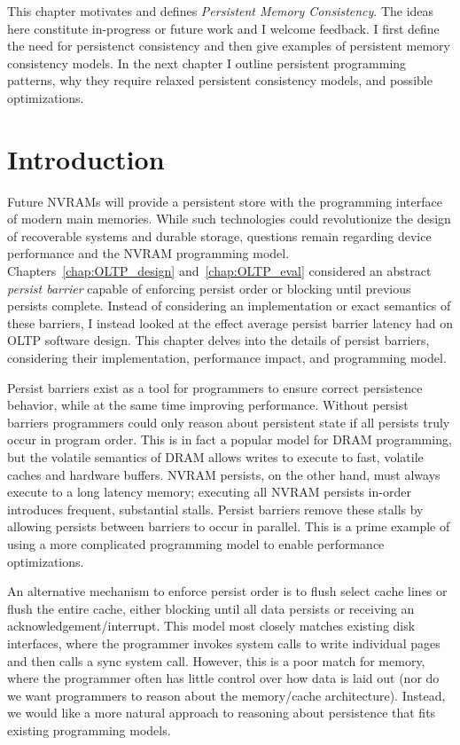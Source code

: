 This chapter motivates and defines \emph{Persistent Memory Consistency}.
The ideas here constitute in-progress or future work and I welcome feedback.
I first define the need for persistenct consistency and then give examples of persistent memory consistency models.
In the next chapter I outline persistent programming patterns, why they require relaxed persistent consistency models, and possible optimizations.

\section{Introduction}
\label{sec:PMC:Intro}

Future NVRAMs will provide a persistent store with the programming interface of modern main memories.
While such technologies could revolutionize the design of recoverable systems and durable storage, questions remain regarding device performance and the NVRAM programming model.
Chapters~\ref{chap:OLTP_design} and~\ref{chap:OLTP_eval} considered an abstract \emph{persist barrier} capable of enforcing persist order or blocking until previous persists complete.
Instead of considering an implementation or exact semantics of these barriers, I instead looked at the effect average persist barrier latency had on OLTP software design.
This chapter delves into the details of persist barriers, considering their implementation, performance impact, and programming model.

Persist barriers exist as a tool for programmers to ensure correct persistence behavior, while at the same time improving performance.
Without persist barriers programmers could only reason about persistent state if all persists truly occur in program order.
This is in fact a popular model for DRAM programming, but the volatile semantics of DRAM allows writes to execute to fast, volatile caches and hardware buffers.
NVRAM persists, on the other hand, must always execute to a long latency memory; executing all NVRAM persists in-order introduces frequent, substantial stalls.
Persist barriers remove these stalls by allowing persists between barriers to occur in parallel.
This is a prime example of using a more complicated programming model to enable performance optimizations.

An alternative mechanism to enforce persist order is to flush select cache lines or flush the entire cache, either blocking until all data persists or receiving an acknowledgement/interrupt.
This model most closely matches existing disk interfaces, where the programmer invokes system calls to write individual pages and then calls a sync system call.
However, this is a poor match for memory, where the programmer often has little control over how data is laid out (nor do we want programmers to reason about the memory/cache architecture).
Instead, we would like a more natural approach to reasoning about persistence that fits existing programming models.

